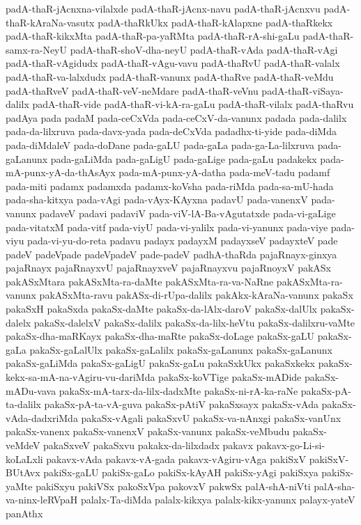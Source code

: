 {padA-thaR-jAcnxna-vilalxde
padA-thaR-jAcnx-navu
padA-thaR-jAcnxvu
padA-thaR-kAraNa-vasutx
padA-thaRkUkx
padA-thaR-kAlapxne
padA-thaRkekx
padA-thaR-kikxMta
padA-thaR-pa-yaRMta
padA-thaR-rA-shi-gaLu
padA-thaR-samx-ra-NeyU
padA-thaR-shoV-dha-neyU
padA-thaR-vAda
padA-thaR-vAgi
padA-thaR-vAgidudx
padA-thaR-vAgu-vavu
padA-thaRvU
padA-thaR-valalx
padA-thaR-va-lalxdudx
padA-thaR-vanunx
padA-thaRve
padA-thaR-veMdu
padA-thaRveV
padA-thaR-veV-neMdare
padA-thaR-veVnu
padA-thaR-viSaya-dalilx
padA-thaR-vide
padA-thaR-vi-kA-ra-gaLu
padA-thaR-vilalx
padA-thaRvu
padAya
pada
padaM
pada-ceCxVda
pada-ceCxV-da-vanunx
padada
pada-dalilx
pada-da-lilxruva
pada-davx-yada
pada-deCxVda
padadhx-ti-yide
pada-diMda
pada-diMdaleV
pada-doDane
pada-gaLU
pada-gaLa
pada-ga-La-lilxruva
pada-gaLanunx
pada-gaLiMda
pada-gaLigU
pada-gaLige
pada-gaLu
padakekx
pada-mA-punx-yA-da-thAsAyx
pada-mA-punx-yA-datha
pada-meV-tadu
padamf
pada-miti
padamx
padamxda
padamx-koVsha
pada-riMda
pada-sa-mU-hada
pada-sha-kitxya
pada-vAgi
pada-vAyx-KAyxna
padavU
pada-vanenxV
pada-vanunx
padaveV
padavi
padaviV
pada-viV-lA-Ba-vAgutatxde
pada-vi-gaLige
pada-vitatxM
pada-vitf
pada-viyU
pada-vi-yalilx
pada-vi-yanunx
pada-viye
pada-viyu
pada-vi-yu-do-reta
padavu
padayx
padayxM
padayxseV
padayxteV
pade
padeV
padeVpade
padeVpadeV
pade-padeV
padhA-thaRda
pajaRnayx-ginxya
pajaRnayx
pajaRnayxvU
pajaRnayxveV
pajaRnayxvu
pajaRnoyxV
pakASx
pakASxMtara
pakASxMta-ra-daMte
pakASxMta-ra-va-NaRne
pakASxMta-ra-vanunx
pakASxMta-ravu
pakASx-di-rUpa-dalilx
pakAkx-kAraNa-vanunx
pakaSx
pakaSxH
pakaSxda
pakaSx-daMte
pakaSx-da-lAlx-daroV
pakaSx-dalUlx
pakaSx-dalelx
pakaSx-dalelxV
pakaSx-dalilx
pakaSx-da-lilx-heVtu
pakaSx-dalilxru-vaMte
pakaSx-dha-maRKayx
pakaSx-dha-maRte
pakaSx-doLage
pakaSx-gaLU
pakaSx-gaLa
pakaSx-gaLalUlx
pakaSx-gaLalilx
pakaSx-gaLanunx
pakaSx-gaLanunx
pakaSx-gaLiMda
pakaSx-gaLigU
pakaSx-gaLu
pakaSxkUkx
pakaSxkekx
pakaSx-kekx-sa-mA-na-vAgiru-vu-dariMda
pakaSx-koVTige
pakaSx-mADide
pakaSx-mADu-vava
pakaSx-mA-tarx-da-lilx-dadxMte
pakaSx-ni-rA-ka-raNe
pakaSx-pA-ta-dalilx
pakaSx-pA-ta-vA-guva
pakaSx-pAtiV
pakaSxsayx
pakaSx-vAda
pakaSx-vAda-dadxriMda
pakaSx-vAgali
pakaSxvU
pakaSx-va-nAnxgi
pakaSx-vanUnx
pakaSx-vanenx
pakaSx-vanenxV
pakaSx-vanunx
pakaSx-veMbudu
pakaSx-veMdeV
pakaSxveV
pakaSxvu
pakakx-da-lilxdadx
pakavx
pakavx-go-Li-si-koLaLxli
pakavx-vAda
pakavx-vA-gada
pakavx-vAgiru-vAga
pakiSxV
pakiSxV-BUtAvx
pakiSx-gaLU
pakiSx-gaLo
pakiSx-kAyAH
pakiSx-yAgi
pakiSxya
pakiSx-yaMte
pakiSxyu
pakiVSx
pakoSxVpa
pakovxV
pakwSx
palA-shA-niVti
palA-sha-va-ninx-leRVpaH
palalx-Ta-diMda
palalx-kikxya
palalx-kikx-yanunx
palayx-yateV
panAthx
}

